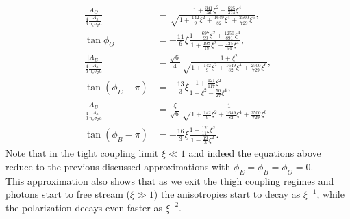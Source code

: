 \begin{subequations}\label{eq:improved_TightCouplingApproximation}
    \begin{align}
        \frac{|A_\Theta|}{\frac{4}{3}\frac{|A_h|}{n_e\sigma_T a}}&=\sqrt\frac{1+\frac{341}{36}\xi^2+\frac{625}{324}\xi^4}{1+\frac{142}{9}\xi^2+\frac{1649}{82}\xi^4+\frac{2500}{729}\xi^6},\nonumber\\\tan\phi_\Theta&=-\frac{11}{6}\xi\frac{1+\frac{697}{99}\xi^2+\frac{1250}{891}\xi^4}{1+\frac{197}{18}\xi^2+\frac{125}{54}\xi^4},\\
        \frac{|A_E|}{\frac{4}{3}\frac{|A_h|}{n_e\sigma_T a}}&=\frac{\sqrt 6}{4}\sqrt\frac{1+\xi^2}{1+\frac{142}{9}\xi^2+\frac{1649}{82}\xi^4+\frac{2500}{729}\xi^6},\nonumber\\\tan(\phi_E-\pi)&=-\frac{13}{3}\xi\frac{1+\frac{121}{117}\xi^2}{1-\xi^2-\frac{50}{27}\xi^4},\\
        \frac{|A_B|}{\frac{4}{3}\frac{|A_h|}{n_e\sigma_T a}}&=\frac{\xi}{\sqrt 6}\sqrt\frac{1}{1+\frac{142}{9}\xi^2+\frac{1649}{82}\xi^4+\frac{2500}{729}\xi^6}\nonumber\\\tan(\phi_B-\pi)&=-\frac{16}{3}\xi\frac{1+\frac{121}{117}\xi^2}{1-\frac{19}{3}\xi^2}.
    \end{align}
\end{subequations}
Note that in the tight coupling limit $\xi\ll1$ and indeed the equations above reduce to the previous discussed approximations with $\phi_E=\phi_B=\phi_\Theta=0$.\\ This approximation also shows that as we exit the thigh coupling regimes and photons start to free stream ($\xi\gg1$) the anisotropies start to decay  as $\xi^{-1}$, while the polarization decays even faster as $\xi^{-2}$.\\
